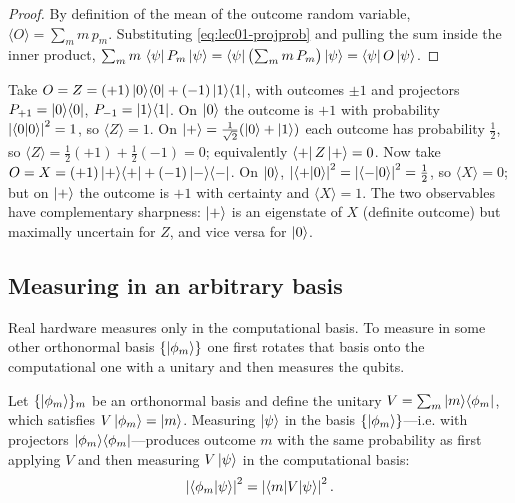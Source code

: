 \begin{proof}
By definition of the mean of the outcome random variable, $\langle O\rangle=\sum_{m}m\,p_{m}$.
Substituting \eqref{eq:lec01-projprob} and pulling the sum inside the inner product,
$\sum_{m}m\,\bra{\psi}P_{m}\ket{\psi}=\bra{\psi}\bigl(\sum_{m}m\,P_{m}\bigr)\ket{\psi}=\bra{\psi}O\ket{\psi}$.
\end{proof}

\begin{example}\label{exa:lec01-measZX}
Take $O=Z=(+1)\ket{0}\!\bra{0}+(-1)\ket{1}\!\bra{1}$, with outcomes $\pm1$ and projectors
$P_{+1}=\ket{0}\!\bra{0}$, $P_{-1}=\ket{1}\!\bra{1}$. On $\ket{0}$ the outcome is $+1$ with
probability $\left\lvert \braket{0|0} \right\rvert^{2}=1$, so $\langle Z\rangle=1$. On
$\ket{+}=\tfrac{1}{\sqrt2}(\ket{0}+\ket{1})$ each outcome has probability $\tfrac12$,
so $\langle Z\rangle=\tfrac12(+1)+\tfrac12(-1)=0$; equivalently
$\bra{+}Z\ket{+}=0$. Now take $O=X=(+1)\ket{+}\!\bra{+}+(-1)\ket{-}\!\bra{-}$. On $\ket{0}$,
$\left\lvert \braket{+|0} \right\rvert^{2}=\left\lvert \braket{-|0} \right\rvert^{2}=\tfrac12$, so $\langle X\rangle=0$; but
on $\ket{+}$ the outcome is $+1$ with certainty and $\langle X\rangle=1$. The two
observables have complementary sharpness: $\ket{+}$ is an eigenstate of $X$ (definite
outcome) but maximally uncertain for $Z$, and vice versa for $\ket{0}$.
\end{example}

\subsection{Measuring in an arbitrary basis}

Real hardware measures only in the computational basis. To measure in some other
orthonormal basis $\{\ket{\phi_{m}}\}$ one first rotates that basis onto the
computational one with a unitary and then measures the qubits.

\begin{proposition}\label{prop:lec01-basischange}
Let $\{\ket{\phi_{m}}\}_{m}$ be an orthonormal basis and define the unitary
$V=\sum_{m}\ket{m}\!\bra{\phi_{m}}$, which satisfies $V\ket{\phi_{m}}=\ket{m}$.
Measuring $\ket{\psi}$ in the basis $\{\ket{\phi_{m}}\}$---i.e. with projectors
$\ket{\phi_{m}}\!\bra{\phi_{m}}$---produces outcome $m$ with the same probability as first applying
$V$ and then measuring $V\ket{\psi}$ in the computational basis:
\[
  \left\lvert \braket{\phi_{m}|\psi} \right\rvert^{2}=\left\lvert \braket{m|V|\psi} \right\rvert^{2}.
\]
\end{proposition}

